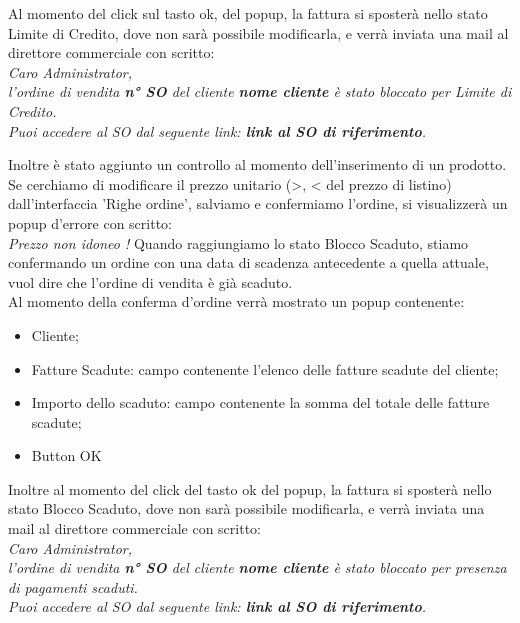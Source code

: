 Al momento del click sul tasto ok, del popup, la fattura si sposterà nello stato Limite di Credito, dove non sarà possibile modificarla, e verrà inviata una mail al direttore commerciale con scritto:\vspace*{0.5cm}\\
\textit{Caro Administrator,\\
	l'ordine di vendita \textbf{n° SO} del cliente \textbf{nome cliente} è stato bloccato per Limite di Credito.\\
	Puoi accedere al SO dal seguente link: \textbf{link al SO di riferimento}.}\vspace*{0.5cm}

Inoltre è stato aggiunto un controllo al momento dell'inserimento di un prodotto. Se cerchiamo di modificare il prezzo unitario (>, < del prezzo di listino) dall'interfaccia 'Righe ordine', salviamo e confermiamo l'ordine, si visualizzerà un popup d'errore con scritto:\\ \textit{Prezzo non idoneo !}
\newpage
Quando raggiungiamo lo stato Blocco Scaduto, stiamo confermando un ordine con una data di scadenza antecedente a quella attuale, vuol dire che l'ordine di vendita è già scaduto.\\
Al momento della conferma d'ordine verrà mostrato un popup contenente:\\
\begin{itemize}
	\item Cliente;
	\item Fatture Scadute: campo contenente l'elenco delle fatture scadute del cliente;
	\item Importo dello scaduto: campo contenente la somma del totale delle fatture scadute;
	\item Button OK
\end{itemize}
\newpage
Inoltre al momento del click del tasto ok del popup, la fattura si sposterà nello stato Blocco Scaduto, dove non sarà possibile modificarla, e verrà inviata una mail al direttore commerciale con scritto:
\vspace*{0.5cm}\\
\textit{Caro Administrator,\\
l'ordine di vendita \textbf{n° SO} del cliente \textbf{nome cliente} è stato bloccato per presenza di pagamenti scaduti.\\
Puoi accedere al SO dal seguente link: \textbf{link al SO di riferimento}.}


